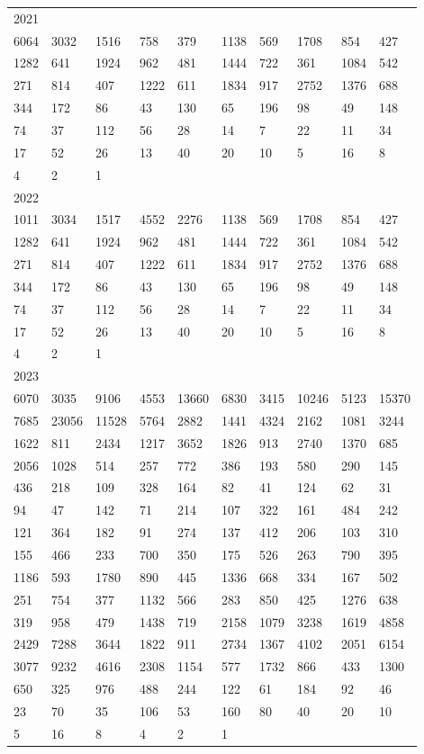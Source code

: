 \begin{longtable}{*{10}{l}}
2021&&&&&&&&&\\
6064& 3032& 1516& 758& 379& 1138& 569& 1708& 854& 427\\
1282& 641& 1924& 962& 481& 1444& 722& 361& 1084& 542\\
271& 814& 407& 1222& 611& 1834& 917& 2752& 1376& 688\\
344& 172& 86& 43& 130& 65& 196& 98& 49& 148\\
74& 37& 112& 56& 28& 14& 7& 22& 11& 34\\
17& 52& 26& 13& 40& 20& 10& 5& 16& 8\\
4& 2& 1& \\

2022&&&&&&&&&\\
1011& 3034& 1517& 4552& 2276& 1138& 569& 1708& 854& 427\\
1282& 641& 1924& 962& 481& 1444& 722& 361& 1084& 542\\
271& 814& 407& 1222& 611& 1834& 917& 2752& 1376& 688\\
344& 172& 86& 43& 130& 65& 196& 98& 49& 148\\
74& 37& 112& 56& 28& 14& 7& 22& 11& 34\\
17& 52& 26& 13& 40& 20& 10& 5& 16& 8\\
4& 2& 1& \\

2023&&&&&&&&&\\
6070& 3035& 9106& 4553& 13660& 6830& 3415& 10246& 5123& 15370\\
7685& 23056& 11528& 5764& 2882& 1441& 4324& 2162& 1081& 3244\\
1622& 811& 2434& 1217& 3652& 1826& 913& 2740& 1370& 685\\
2056& 1028& 514& 257& 772& 386& 193& 580& 290& 145\\
436& 218& 109& 328& 164& 82& 41& 124& 62& 31\\
94& 47& 142& 71& 214& 107& 322& 161& 484& 242\\
121& 364& 182& 91& 274& 137& 412& 206& 103& 310\\
155& 466& 233& 700& 350& 175& 526& 263& 790& 395\\
1186& 593& 1780& 890& 445& 1336& 668& 334& 167& 502\\
251& 754& 377& 1132& 566& 283& 850& 425& 1276& 638\\
319& 958& 479& 1438& 719& 2158& 1079& 3238& 1619& 4858\\
2429& 7288& 3644& 1822& 911& 2734& 1367& 4102& 2051& 6154\\
3077& 9232& 4616& 2308& 1154& 577& 1732& 866& 433& 1300\\
650& 325& 976& 488& 244& 122& 61& 184& 92& 46\\
23& 70& 35& 106& 53& 160& 80& 40& 20& 10\\
5& 16& 8& 4& 2& 1& \\


\end{longtable}
